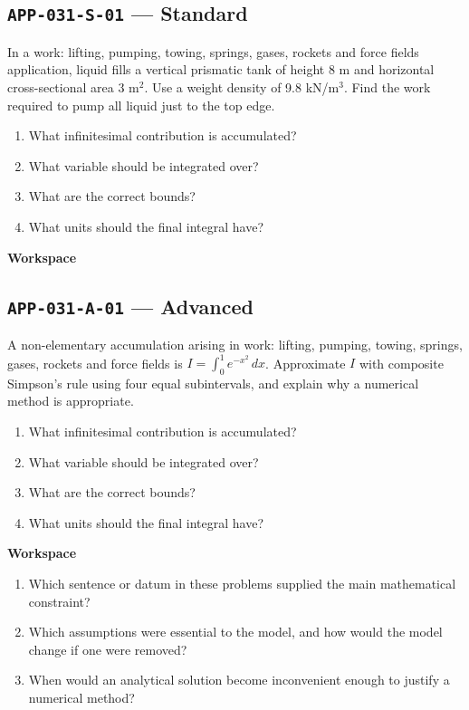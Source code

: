 \documentclass[11pt]{book}
\newcommand{\pid}[1]{\texttt{#1}}
\newcommand{\workspace}{\par\vspace{0.7in}\hrulefill\par\vspace{0.55in}\hrulefill\par}
\begin{document}
\subsection*{\pid{APP-031-S-01} — Standard}
\begin{problembox}
In a work: lifting, pumping, towing, springs, gases, rockets and force fields application, liquid fills a vertical prismatic tank of height 8 m and horizontal cross-sectional area 3 m$^2$. Use a weight density of 9.8 kN/m$^3$. Find the work required to pump all liquid just to the top edge.
\end{problembox}
\begin{promptbox}\begin{enumerate}
\item What infinitesimal contribution is accumulated?
\item What variable should be integrated over?
\item What are the correct bounds?
\item What units should the final integral have?
\end{enumerate}\end{promptbox}
\textbf{Workspace}\workspace
{}
\subsection*{\pid{APP-031-A-01} — Advanced}
\begin{problembox}
A non-elementary accumulation arising in work: lifting, pumping, towing, springs, gases, rockets and force fields is $I=\int_0^1 e^{-x^2}\,dx$. Approximate $I$ with composite Simpson's rule using four equal subintervals, and explain why a numerical method is appropriate.
\end{problembox}
\begin{promptbox}\begin{enumerate}
\item What infinitesimal contribution is accumulated?
\item What variable should be integrated over?
\item What are the correct bounds?
\item What units should the final integral have?
\end{enumerate}\end{promptbox}
\textbf{Workspace}\workspace
\begin{reflectionbox}\begin{enumerate}
\item Which sentence or datum in these problems supplied the main mathematical constraint?
\item Which assumptions were essential to the model, and how would the model change if one were removed?
\item When would an analytical solution become inconvenient enough to justify a numerical method?
\end{enumerate}\end{reflectionbox}
\end{document}
